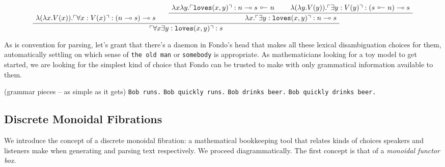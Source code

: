 \begin{example}
\[
\AxiomC{$\lambda (\lambda x . V(x)) . \ulcorner \forall x : V(x) \urcorner : (n \multimap s) \multimap s$}
\AxiomC{$\lambda x \lambda y . \ulcorner \texttt{loves}(x,y) \urcorner : n \multimap s \ \rotatebox[origin=c]{180}{$\multimap$} \ n$}
\AxiomC{$\lambda (\lambda y . V(y)) . \ulcorner \exists y : V(y) \urcorner : (s \ \rotatebox[origin=c]{180}{$\multimap$} \ n) \multimap s$}
\BinaryInfC{$\lambda x . \ulcorner \exists y : \texttt{loves}(x,y) \urcorner : n \multimap s$}
\BinaryInfC{$ \ulcorner \forall x \exists y : \texttt{loves}(x,y) \urcorner : s$}
\DisplayProof
\]

\end{example}

As is convention for parsing, let's grant that there's a daemon in Fondo's head that makes all these lexical disambiguation choices for them, automatically settling on which sense of \texttt{the old man} or \texttt{somebody} is appropriate. As mathematicians looking for a toy model to get started, we are looking for the simplest kind of choice that Fondo can be trusted to make with only grammatical information available to them.


\begin{example}
(grammar pieces -- as simple as it gets)
\texttt{Bob runs.}
\texttt{Bob quickly runs.}
\texttt{Bob drinks beer.}
\texttt{Bob quickly drinks beer.}

\end{example}

\subsection{Discrete Monoidal Fibrations}

We introduce the concept of a discrete monoidal fibration: a mathematical bookkeeping tool that relates kinds of choices speakers and listeners make when generating and parsing text respectively. We proceed diagrammatically. The first concept is that of a \emph{monoidal functor box}.

